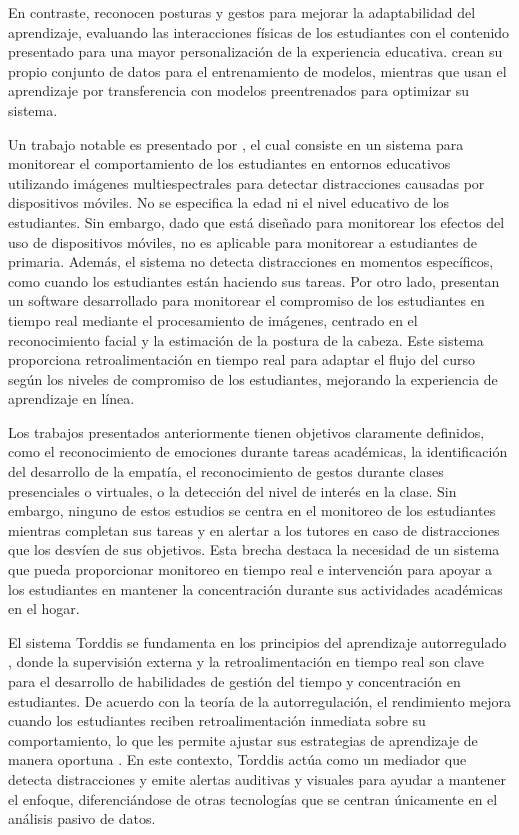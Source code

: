 \documentclass[a4paper,fleqn]{cas-sc}
\begin{document}
	En contraste, \cite{Riquelme2013} reconocen posturas y gestos para mejorar la adaptabilidad del aprendizaje, evaluando las interacciones físicas de los estudiantes con el contenido presentado para una mayor personalización de la experiencia educativa. \cite{Nguyen2019} crean su propio conjunto de datos para el entrenamiento de modelos, mientras que \cite{Riquelme2013} usan el aprendizaje por transferencia con modelos preentrenados para optimizar su sistema.
	
	Un trabajo notable es presentado por \cite{Campbell2015Using}, el cual consiste en un sistema para monitorear el comportamiento de los estudiantes en entornos educativos utilizando imágenes multiespectrales para detectar distracciones causadas por dispositivos móviles. No se especifica la edad ni el nivel educativo de los estudiantes. Sin embargo, dado que está diseñado para monitorear los efectos del uso de dispositivos móviles, no es aplicable para monitorear a estudiantes de primaria. Además, el sistema no detecta distracciones en momentos específicos, como cuando los estudiantes están haciendo sus tareas. Por otro lado, \cite{Ucar2022Recognizing} presentan un software desarrollado para monitorear el compromiso de los estudiantes en tiempo real mediante el procesamiento de imágenes, centrado en el reconocimiento facial y la estimación de la postura de la cabeza. Este sistema proporciona retroalimentación en tiempo real para adaptar el flujo del curso según los niveles de compromiso de los estudiantes, mejorando la experiencia de aprendizaje en línea.
	
	Los trabajos presentados anteriormente tienen objetivos claramente definidos, como el reconocimiento de emociones durante tareas académicas, la identificación del desarrollo de la empatía, el reconocimiento de gestos durante clases presenciales o virtuales, o la detección del nivel de interés en la clase. Sin embargo, ninguno de estos estudios se centra en el monitoreo de los estudiantes mientras completan sus tareas y en alertar a los tutores en caso de distracciones que los desvíen de sus objetivos. Esta brecha destaca la necesidad de un sistema que pueda proporcionar monitoreo en tiempo real e intervención para apoyar a los estudiantes en mantener la concentración durante sus actividades académicas en el hogar.
	
	El sistema Torddis se fundamenta en los principios del aprendizaje autorregulado \cite{NG201865}, donde la supervisión externa y la retroalimentación en tiempo real son clave para el desarrollo de habilidades de gestión del tiempo y concentración en estudiantes. De acuerdo con la teoría de la autorregulación, el rendimiento mejora cuando los estudiantes reciben retroalimentación inmediata sobre su comportamiento, lo que les permite ajustar sus estrategias de aprendizaje de manera oportuna \cite{Taber2024Developing}. En este contexto, Torddis actúa como un mediador que detecta distracciones y emite alertas auditivas y visuales para ayudar a mantener el enfoque, diferenciándose de otras tecnologías que se centran únicamente en el análisis pasivo de datos.
	
\end{document}
